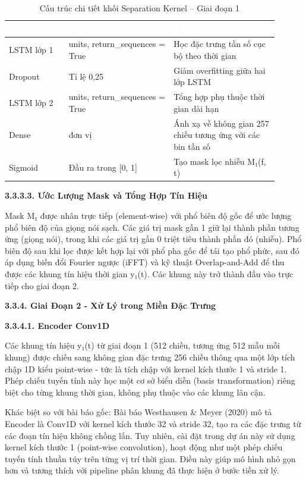 \documentclass[
  13pt,
]{article}
\begin{document}
\begin{table}[htbp]
\centering
\caption{Cấu trúc chi tiết khối Separation Kernel -- Giai đoạn 1}
\label{tab:sep-kernel}
\begin{tabular}{>{\raggedright\arraybackslash}p{0.2\linewidth} >{\centering\arraybackslash}p{0.35\linewidth} >{\raggedright\arraybackslash}p{0.35\linewidth}}
\toprule
\rowcolor{headerblue} \textcolor{white}{\textbf{Thành phần}} & \textcolor{white}{\textbf{Thông số}} & \textcolor{white}{\textbf{Vai trò}} \\
\midrule
\rowcolor{rowgray} LSTM lớp 1 & 128 units, return\_sequences = True & Học đặc trưng tần số cục bộ theo thời gian \\
Dropout & Tỉ lệ 0,25 & Giảm overfitting giữa hai lớp LSTM \\
\rowcolor{rowgray} LSTM lớp 2 & 128 units, return\_sequences = True & Tổng hợp phụ thuộc thời gian dài hạn \\
Dense & 257 đơn vị & Ánh xạ về không gian 257 chiều tương ứng với các bin tần số \\
\rowcolor{rowgray} Sigmoid & Đầu ra trong {[}0, 1{]} & Tạo mask lọc nhiễu M₁(f, t) \\
\bottomrule
\end{tabular}
\end{table}

\textbf{3.3.3.3. Ước Lượng Mask và Tổng Hợp Tín Hiệu}

Mask M₁ được nhân trực tiếp (element-wise) với phổ biên độ gốc để ước
lượng phổ biên độ của giọng nói sạch. Các giá trị mask gần 1 giữ lại
thành phần tương ứng (giọng nói), trong khi các giá trị gần 0 triệt tiêu
thành phần đó (nhiễu). Phổ biên độ sau khi lọc được kết hợp lại với phổ
pha gốc để tái tạo phổ phức, sau đó áp dụng biến đổi Fourier ngược
(iFFT) và kỹ thuật Overlap-and-Add để thu được các khung tín hiệu thời
gian y₁(t). Các khung này trở thành đầu vào trực tiếp cho giai đoạn 2.

\textbf{3.3.4. Giai Đoạn 2 - Xử Lý trong Miền Đặc Trưng}

\textbf{3.3.4.1. Encoder Conv1D}

Các khung tín hiệu y₁(t) từ giai đoạn 1 (512 chiều, tương ứng 512 mẫu
mỗi khung) được chiếu sang không gian đặc trưng 256 chiều thông qua một
lớp tích chập 1D kiểu point-wise - tức là tích chập với kernel kích
thước 1 và stride 1. Phép chiếu tuyến tính này học một cơ sở biểu diễn
(basis transformation) riêng biệt cho từng khung thời gian, không phụ
thuộc vào các khung lân cận.

Khác biệt so với bài báo gốc: Bài báo Westhausen \& Meyer (2020) mô tả
Encoder là Conv1D với kernel kích thước 32 và stride 32, tạo ra các đặc
trưng từ các đoạn tín hiệu không chồng lấn. Tuy nhiên, cài đặt trong dự
án này sử dụng kernel kích thước 1 (point-wise convolution), hoạt động
như một phép chiếu tuyến tính thuần túy trên từng vị trí thời gian. Điều
này giúp mô hình nhỏ gọn hơn và tương thích với pipeline phân khung đã
thực hiện ở bước tiền xử lý.
\end{document}
